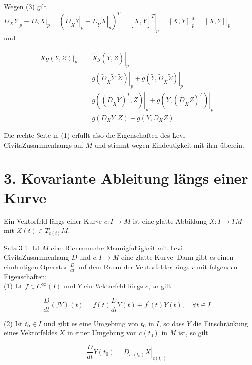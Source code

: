 \documentclass[10pt]{article}
\begin{document}
Wegen (3) gilt\\
$\left.D_{X} Y\right|_{p}-\left.D_{Y} X\right|_{p}=\left(\left.\tilde{D}_{\tilde{X}} \tilde{Y}\right|_{p}-\left.\tilde{D}_{\tilde{Y}} \tilde{X}\right|_{p}\right)^{T}=\left.[\tilde{X}, \tilde{Y}]^{T}\right|_{p}=\left.[X, Y]\right|_{p} ^{T}=\left.[X, Y]\right|_{p}$\\
und

$$
\begin{aligned}
\left.X g(Y, Z)\right|_{p} & =\left.\tilde{X} g(\tilde{Y}, \tilde{Z})\right|_{p} \\
& =\left.g\left(\tilde{D}_{\tilde{X}} \tilde{Y}, \tilde{Z}\right)\right|_{p}+\left.g\left(\tilde{Y}, \tilde{D}_{\tilde{X}} \tilde{Z}\right)\right|_{p} \\
& =\left.g\left(\left(\tilde{D}_{\tilde{X}} \tilde{Y}\right)^{T}, Z\right)\right|_{p}+\left.g\left(Y,\left(\tilde{D}_{\tilde{X}} \tilde{Z}\right)^{T}\right)\right|_{p} \\
& =g\left(D_{X} Y, Z\right)+g\left(Y, D_{X} Z\right)
\end{aligned}
$$

Die rechte Seite in (1) erfüllt also die Eigenschaften des Levi-CivitaZusammenhangs auf $M$ und stimmt wegen Eindeutigkeit mit ihm überein.

\section*{3. Kovariante Ableitung längs einer Kurve}
Ein Vektorfeld längs einer Kurve $c: I \rightarrow M$ ist eine glatte Abbildung $X: I \rightarrow T M$ mit $X(t) \in T_{c(t)} M$.

Satz 3.1. Ist $M$ eine Riemannsche Mannigfaltigkeit mit Levi-CivitaZusammenhang $D$ und $c: I \rightarrow M$ eine glatte Kurve. Dann gibt es einen eindeutigen Operator $\frac{D}{d t}$ auf dem Raum der Vektorfelder längs $c$ mit folgenden Eigenschaften:\\
(1) Ist $f \in C^{\infty}(I)$ und $Y$ ein Vektorfeld längs $c$, so gilt

$$
\frac{D}{d t}(f Y)(t)=f(t) \frac{D}{d t} Y(t)+f^{\prime}(t) Y(t), \quad \forall t \in I
$$

(2) Ist $t_{0} \in I$ und gibt es eine Umgebung von $t_{0}$ in $I$, so dass $Y$ die Einschränkung eines Vektorfeldes $X$ in einer Umgebung von $c\left(t_{0}\right)$ in $M$ ist, so gilt

$$
\frac{D}{d t} Y\left(t_{0}\right)=\left.D_{c^{\prime}\left(t_{0}\right)} X\right|_{c\left(t_{0}\right)}
$$
\end{document}
